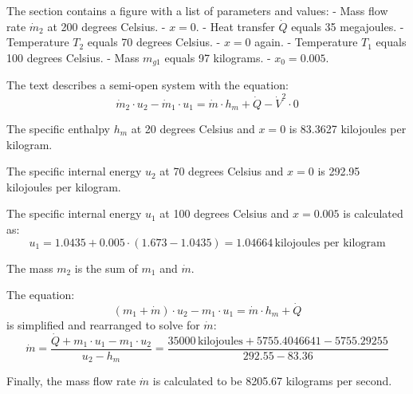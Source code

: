 The section contains a figure with a list of parameters and values:
- Mass flow rate \( \dot{m}_2 \) at 200 degrees Celsius.
- \( x = 0 \).
- Heat transfer \( \dot{Q} \) equals 35 megajoules.
- Temperature \( T_2 \) equals 70 degrees Celsius.
- \( x = 0 \) again.
- Temperature \( T_1 \) equals 100 degrees Celsius.
- Mass \( m_{g1} \) equals 97 kilograms.
- \( x_0 = 0.005 \).

The text describes a semi-open system with the equation:
\[ \dot{m}_2 \cdot u_2 - \dot{m}_1 \cdot u_1 = \dot{m} \cdot h_m + \dot{Q} - \dot{V}^2 \cdot 0 \]

The specific enthalpy \( h_m \) at 20 degrees Celsius and \( x = 0 \) is 83.3627 kilojoules per kilogram.

The specific internal energy \( u_2 \) at 70 degrees Celsius and \( x = 0 \) is 292.95 kilojoules per kilogram.

The specific internal energy \( u_1 \) at 100 degrees Celsius and \( x = 0.005 \) is calculated as:
\[ u_1 = 1.0435 + 0.005 \cdot (1.673 - 1.0435) = 1.04664 \, \text{kilojoules per kilogram} \]

The mass \( m_2 \) is the sum of \( m_1 \) and \( \dot{m} \).

The equation:
\[ (m_1 + \dot{m}) \cdot u_2 - m_1 \cdot u_1 = \dot{m} \cdot h_m + \dot{Q} \]
is simplified and rearranged to solve for \( \dot{m} \):
\[ \dot{m} = \frac{\dot{Q} + m_1 \cdot u_1 - m_1 \cdot u_2}{u_2 - h_m} = \frac{35000 \, \text{kilojoules} + 5755.4046641 - 5755.29255}{292.55 - 83.36} \]

Finally, the mass flow rate \( \dot{m} \) is calculated to be 8205.67 kilograms per second.